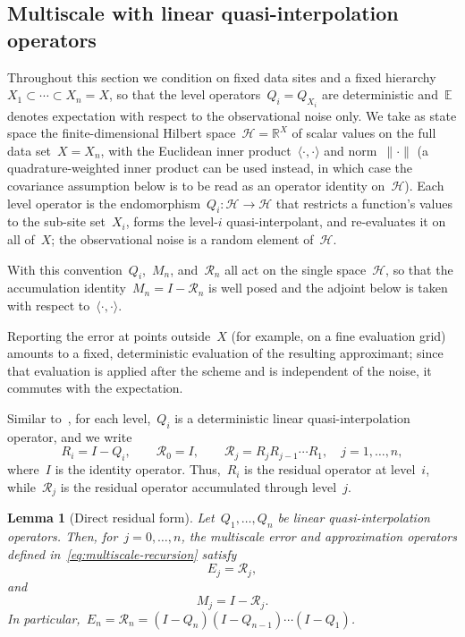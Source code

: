 \documentclass[12pt]{article}
\newtheorem{lemma}[theorem]{Lemma}
\newcommand{\E}{{\mathbb{E}}}
\newcommand{\R}{\mathbb{R}}
\begin{document}
\subsection{Multiscale with linear quasi-interpolation operators}\label{sec:linear}

Throughout this section we condition on fixed data sites and a fixed hierarchy~$X_1\subset\cdots\subset X_n=X$, so that the level operators~$Q_i=Q_{X_i}$ are deterministic and~$\E$ denotes expectation with respect to the observational noise only. We take as state space the finite-dimensional Hilbert space~$\mathcal H=\R^{X}$ of scalar values on the full data set~$X=X_n$, with the Euclidean inner product~$\langle\cdot,\cdot\rangle$ and norm~$\|\cdot\|$ (a quadrature-weighted inner product can be used instead, in which case the covariance assumption below is to be read as an operator identity on~$\mathcal H$). Each level operator is the endomorphism~$Q_i:\mathcal H\to\mathcal H$ that restricts a function's values to the sub-site set~$X_i$, forms the level-$i$ quasi-interpolant, and re-evaluates it on all of~$X$; the observational noise is a random element of~$\mathcal H$.

With this convention~$Q_i$,~$M_n$, and~$\mathcal R_n$ all act on the single space~$\mathcal H$, so that the accumulation identity~$M_n=I-\mathcal R_n$ is well posed and the adjoint below is taken with respect to~$\langle\cdot,\cdot\rangle$.

Reporting the error at points outside~$X$ (for example, on a fine evaluation grid) amounts to a fixed, deterministic evaluation of the resulting approximant; since that evaluation is applied after the scheme and is independent of the noise, it commutes with the expectation.

Similar to~\cite{franz2023multilevel}, for each level,~$Q_i$ is a deterministic linear quasi-interpolation operator, and we write
\[
    R_i = I-Q_i,
    \qquad
    \mathcal R_0=I,
    \qquad
    \mathcal R_j = R_j R_{j-1}\cdots R_1,\quad j=1,\ldots,n,
\]
where~$I$ is the identity operator. Thus,~$R_i$ is the residual operator at level~$i$, while~$\mathcal R_j$ is the residual operator accumulated through level~$j$.


\begin{lemma}[Direct residual form]\label{lem:direct-residual-form}
Let~$Q_1,\ldots,Q_n$ be linear quasi-interpolation operators. Then, for~$j=0,\ldots,n$, the multiscale error and approximation operators defined in~\eqref{eq:multiscale-recursion} satisfy
\begin{equation}\label{eq:direct-error-form}
    E_j = \mathcal R_j,
\end{equation}
and
\begin{equation}\label{eq:direct-approx-form}
    M_j = I-\mathcal R_j.
\end{equation}
In particular,~$E_n= \mathcal R_n=(I-Q_n)(I-Q_{n-1})\cdots(I-Q_1)$.
\end{lemma}
\end{document}
